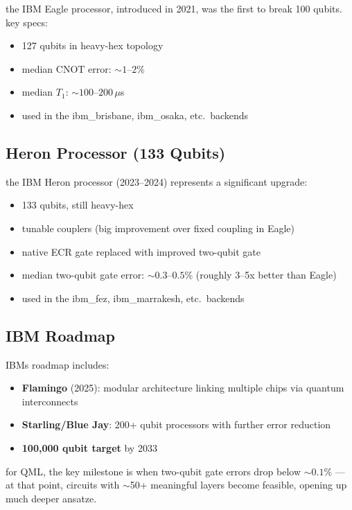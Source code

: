 \documentclass[11pt,a4paper]{article}
\theoremstyle{definition}
\theoremstyle{remark}
\begin{document}
the IBM Eagle processor, introduced in 2021, was the first to break 100 qubits. key specs:
\begin{itemize}[leftmargin=*]
    \item 127 qubits in heavy-hex topology
    \item median CNOT error: $\sim 1$--$2\%$
    \item median $T_1$: $\sim 100$--$200 \, \mu$s
    \item used in the ibm\_brisbane, ibm\_osaka, etc.\ backends
\end{itemize}

\subsection{Heron Processor (133 Qubits)}

the IBM Heron processor (2023--2024) represents a significant upgrade:
\begin{itemize}[leftmargin=*]
    \item 133 qubits, still heavy-hex
    \item tunable couplers (big improvement over fixed coupling in Eagle)
    \item native ECR gate replaced with improved two-qubit gate
    \item median two-qubit gate error: $\sim 0.3$--$0.5\%$ (roughly 3--5x better than Eagle)
    \item used in the ibm\_fez, ibm\_marrakesh, etc.\ backends
\end{itemize}

\subsection{IBM Roadmap}

IBMs roadmap includes:
\begin{itemize}[leftmargin=*]
    \item \textbf{Flamingo} (2025): modular architecture linking multiple chips via quantum interconnects
    \item \textbf{Starling/Blue Jay}: 200+ qubit processors with further error reduction
    \item \textbf{100,000 qubit target} by 2033
\end{itemize}

for QML, the key milestone is when two-qubit gate errors drop below $\sim 0.1\%$ --- at that point, circuits with $\sim$50+ meaningful layers become feasible, opening up much deeper ansatze.
\end{document}

